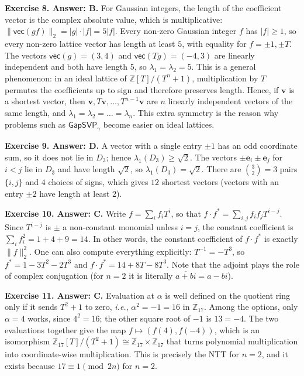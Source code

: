 \documentclass[../../book]{subfiles}
\begin{document}
 
\textbf{Exercise 8. Answer: B.} For Gaussian integers, the length of the coefficient vector is the complex absolute value, which is multiplicative: $\|\mathsf{vec}(gf)\|_2 = |g| \cdot |f| = 5|f|$.
Every non-zero Gaussian integer $f$ has $|f| \geq 1$, so every non-zero lattice vector has length at least $5$, with equality for $f = \pm 1, \pm T$.
The vectors $\mathsf{vec}(g) = (3,4)$ and $\mathsf{vec}(Tg) = (-4,3)$ are linearly independent and both have length $5$, so $\lambda_1 = \lambda_2 = 5$.
This is a general phenomenon: in an ideal lattice of $\mathbb{Z}[T]/(T^n+1)$, multiplication by $T$ permutes the coefficients up to sign and therefore preserves length.
Hence, if $\mathbf{v}$ is a shortest vector, then $\mathbf{v}, T\mathbf{v}, \dots, T^{n-1}\mathbf{v}$ are $n$ linearly independent vectors of the same length, and $\lambda_1 = \lambda_2 = \dots = \lambda_n$.
This extra symmetry is the reason why problems such as $\mathsf{GapSVP}_{\gamma}$ become easier on ideal lattices.
 
 
\textbf{Exercise 9. Answer: D.} A vector with a single entry $\pm 1$ has an odd coordinate sum, so it does not lie in $D_3$; hence $\lambda_1(D_3) \geq \sqrt{2}$.
The vectors $\pm\mathbf{e}_i \pm \mathbf{e}_j$ for $i < j$ lie in $D_3$ and have length $\sqrt{2}$, so $\lambda_1(D_3) = \sqrt{2}$.
There are $\binom{3}{2} = 3$ pairs $\{i,j\}$ and $4$ choices of signs, which gives $12$ shortest vectors (vectors with an entry $\pm 2$ have length at least $2$).

\textbf{Exercise 10. Answer: C.} Write $f = \sum_i f_iT^i$, so that $f \cdot f^{\ast} = \sum_{i,j} f_if_jT^{i-j}$.
Since $T^{i-j}$ is $\pm$ a non-constant monomial unless $i = j$, the constant coefficient is $\sum_i f_i^2 = 1 + 4 + 9 = 14$.
In other words, the constant coefficient of $f \cdot f^{\ast}$ is exactly $\|f\|_2^2$.
One can also compute everything explicitly: $T^{-1} = -T^3$, so $f^{\ast} = 1 - 3T^2 - 2T^3$ and $f \cdot f^{\ast} = 14 + 8T - 8T^3$.
Note that the adjoint plays the role of complex conjugation (for $n = 2$ it is literally $\overline{a+bi} = a-bi$).
 
\textbf{Exercise 11. Answer: C.} Evaluation at $\alpha$ is well defined on the quotient ring only if it sends $T^2 + 1$ to zero, \textit{i.e.}, $\alpha^2 = -1 = 16$ in $\mathbb{Z}_{17}$.
Among the options, only $\alpha = 4$ works, since $4^2 = 16$; the other square root of $-1$ is $13 = -4$.
The two evaluations together give the map $f \mapsto (f(4), f(-4))$, which is an isomorphism $\mathbb{Z}_{17}[T]/(T^2+1) \cong \mathbb{Z}_{17} \times \mathbb{Z}_{17}$ that turns polynomial multiplication into coordinate-wise multiplication.
This is precisely the NTT for $n = 2$, and it exists because $17 \equiv 1 \pmod{2n}$ for $n=2$. 
\end{document}
